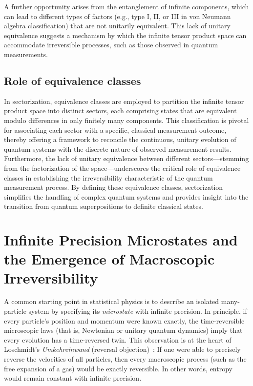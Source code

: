 \documentclass[shortAfour,sageh,times]{sagej}
\begin{document}
A further opportunity arises from the entanglement of infinite components, which can lead to different types of factors (e.g., type I, II, or III in von Neumann algebra classification) that are not unitarily equivalent. This lack of unitary equivalence suggests a mechanism by which the infinite tensor product space can accommodate irreversible processes, such as those observed in quantum measurements.

\subsection{Role of equivalence classes}


In sectorization, equivalence classes are employed to partition the infinite tensor product space into distinct sectors, each comprising states that are equivalent modulo differences in only finitely many components.
This classification is pivotal for associating each sector with a specific, classical measurement outcome, thereby offering a framework to reconcile the continuous, unitary evolution of quantum systems with the discrete nature of observed measurement results.
Furthermore, the lack of unitary equivalence between different sectors---stemming from the factorization of the space---underscores the critical role of equivalence classes in establishing the irreversibility characteristic of the quantum measurement process.
By defining these equivalence classes, sectorization simplifies the handling of complex quantum systems and provides insight into the transition from quantum superpositions to definite classical states.


\section{Infinite Precision Microstates and the Emergence of Macroscopic Irreversibility}

A common starting point in statistical physics is to describe an isolated many-particle system by specifying its \emph{microstate} with infinite precision.
In principle, if every particle's position and momentum were known exactly, the time-reversible microscopic laws (that is, Newtonian or unitary quantum dynamics) imply that every evolution has a time-reversed twin.
This observation is at the heart of Loschmidt's \textit{Umkehreinwand} (reversal objection)~\citep{darrigol-2021}:
If one were able to precisely reverse the velocities of all particles, then every macroscopic process (such as the free expansion of a gas) would be exactly reversible.
In other words, entropy would remain constant with infinite precision.
\end{document}
